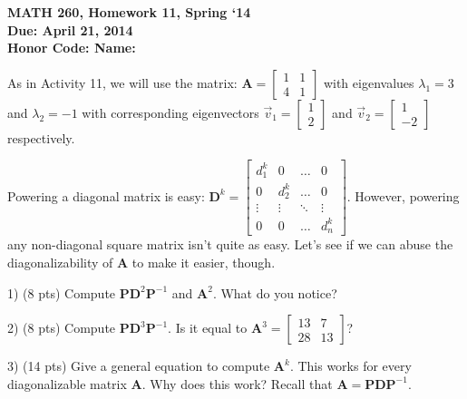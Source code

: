 \documentclass{article}
\begin{document}
\begin{flushleft}
	\bfseries{MATH 260, Homework 11, Spring `14}\\
	\bfseries{Due: April 21, 2014}\\
	\bfseries{Honor Code:} \hspace{3.5in}\bfseries{Name:}\\
\end{flushleft}
\begin{flushleft}
\vspace{.25in}

As in Activity 11, we will use the matrix: $\textbf{A} = \begin{bmatrix} 1 & 1 \\ 4 & 1 \end{bmatrix}$ with eigenvalues $\lambda_1 = 3$ and $\lambda_2 = -1$ with corresponding eigenvectors $\vec{v}_1 = \begin{bmatrix} 1 \\ 2 \end{bmatrix}$ and $\vec{v}_2 = \begin{bmatrix} 1 \\ -2 \end{bmatrix}$ respectively.

\vspace{0.2in}

Powering a diagonal matrix is easy: $\textbf{D}^k = \begin{bmatrix}
d_1^k & 0 & \ldots & 0 \\
0 & d_2^k & \ldots & 0 \\
\vdots & \vdots & \ddots & \vdots \\
0 & 0 & \ldots & d_n^k
\end{bmatrix}$.  However, powering any non-diagonal square matrix isn't quite as easy.  Let's see if we can abuse the diagonalizability of $\textbf{A}$ to make it easier, though.

\vspace{0.2in}

1) (8 pts) Compute $\textbf{PD}^2 \textbf{P}^{-1}$ and $\textbf{A}^2 $.  What do you notice?

\vspace{3in}

2) (8 pts) Compute $\textbf{PD}^3 \textbf{P}^{-1}$.  Is it equal to $\textbf{A}^3 = \begin{bmatrix} 13 & 7 \\ 28 & 13 \end{bmatrix}$?

\vspace{3in}

3) (14 pts) Give a general equation to compute $\textbf{A}^k$.  This works for every diagonalizable matrix $\textbf{A}$.  Why does this work?  Recall that $\textbf{A} = \textbf{PDP}^{-1}$.

\end{flushleft}
\end{document}
